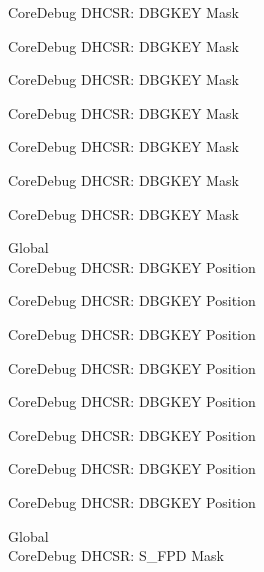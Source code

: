 \begin{DoxyRefList}
\label{deprecated__deprecated000106}%
%
Core\+Debug DHCSR\+: DBGKEY Mask 

\label{deprecated__deprecated000160}%
%
Core\+Debug DHCSR\+: DBGKEY Mask 

\label{deprecated__deprecated000245}%
%
Core\+Debug DHCSR\+: DBGKEY Mask 

\label{deprecated__deprecated000302}%
%
Core\+Debug DHCSR\+: DBGKEY Mask 

\label{deprecated__deprecated000378}%
%
Core\+Debug DHCSR\+: DBGKEY Mask 

\label{deprecated__deprecated000457}%
%
Core\+Debug DHCSR\+: DBGKEY Mask 

\label{deprecated__deprecated000559}%
%
Core\+Debug DHCSR\+: DBGKEY Mask  
\item[Global \doxylink{group___c_m_s_i_s___core_debug_gac91280edd0ce932665cf75a23d11d842}{Core\+Debug\+\_\+\+DHCSR\+\_\+\+DBGKEY\+\_\+\+Pos} ]\hfill \\
\label{deprecated__deprecated000005}%
%
Core\+Debug DHCSR\+: DBGKEY Position 

\label{deprecated__deprecated000105}%
%
Core\+Debug DHCSR\+: DBGKEY Position 

\label{deprecated__deprecated000159}%
%
Core\+Debug DHCSR\+: DBGKEY Position 

\label{deprecated__deprecated000244}%
%
Core\+Debug DHCSR\+: DBGKEY Position 

\label{deprecated__deprecated000301}%
%
Core\+Debug DHCSR\+: DBGKEY Position 

\label{deprecated__deprecated000377}%
%
Core\+Debug DHCSR\+: DBGKEY Position 

\label{deprecated__deprecated000456}%
%
Core\+Debug DHCSR\+: DBGKEY Position 

\label{deprecated__deprecated000558}%
%
Core\+Debug DHCSR\+: DBGKEY Position  
\item[Global \doxylink{group___c_m_s_i_s___s_c_b_gae37ad624177fe2d3298fd32d528805aa}{Core\+Debug\+\_\+\+DHCSR\+\_\+\+S\+\_\+\+FPD\+\_\+\+Msk} ]\hfill \\
\label{deprecated__deprecated000014}%
%
Core\+Debug DHCSR\+: S\+\_\+\+FPD Mask 


\end{DoxyRefList}
